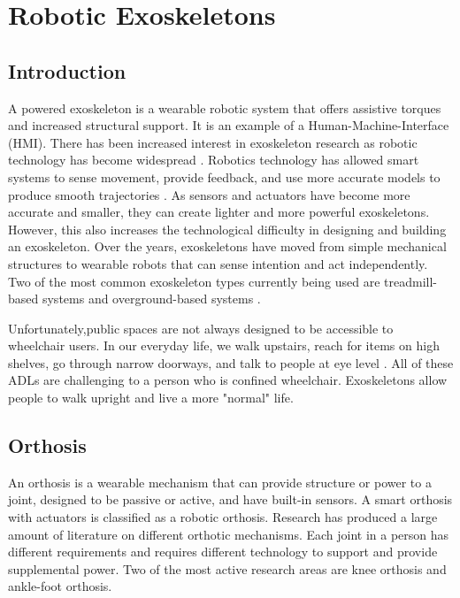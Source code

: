 \section{Robotic Exoskeletons}
\label{sec:ExoBack}
\subsection{Introduction}

A powered exoskeleton is a wearable robotic system that offers assistive torques and increased structural support. It is an example of a Human-Machine-Interface (HMI). There has been increased interest in exoskeleton research as robotic technology has become widespread \cite{aliman2017design} \cite{chen2016recent} \cite{mertz2012next} \cite{gardner2017review}. Robotics technology has allowed smart systems to sense movement, provide feedback, and use more accurate models to produce smooth trajectories \cite{5462998}. As sensors and actuators have become more accurate and smaller, they can create lighter and more powerful exoskeletons. However, this also increases the technological difficulty in designing and building an exoskeleton. Over the years, exoskeletons have moved from simple mechanical structures to wearable robots that can sense intention and act independently. Two of the most common exoskeleton types currently being used are treadmill-based systems and overground-based systems \cite{diaz2011lower}.

Unfortunately,public spaces are not always designed to be accessible to wheelchair users. In our everyday life, we walk upstairs, reach for items on high shelves, go through narrow doorways, and talk to people at eye level \cite{welage2011wheelchair}. All of these ADLs are challenging to a person who is  confined wheelchair. Exoskeletons allow people to walk upright and live a more "normal" life. 


\subsection{Orthosis}

An orthosis is a wearable mechanism that can provide structure or power to a joint, designed to be passive or active, and have built-in sensors. A smart orthosis with actuators is classified as a robotic orthosis. Research has produced a large amount of literature on different orthotic mechanisms. Each joint in a person has different requirements and requires different technology to support and provide supplemental power. Two of the most active research areas are knee orthosis and ankle-foot orthosis. 


